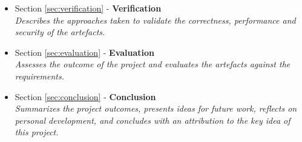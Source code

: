 \begin{itemize}
	\item Section \ref{sec:verification} - \textbf{Verification} \\ \textit{Describes the approaches taken to validate the correctness, performance and security of the artefacts.}
	\item Section \ref{sec:evaluation} - \textbf{Evaluation} \\ \textit{Assesses the outcome of the project and evaluates the artefacts against the requirements.}
	\item Section \ref{sec:conclusion} - \textbf{Conclusion} \\ \textit{Summarizes the project outcomes, presents ideas for future work, reflects on personal development, and concludes with an attribution to the key idea of this project.}
\end{itemize}
